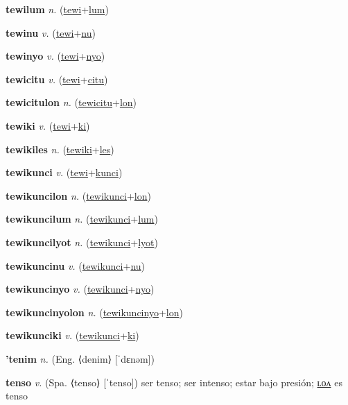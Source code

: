 \textbf{\hypertarget{tewilum}{tewilum}} \textit{n.} (\hyperlink{tewi}{tewi}+\allowbreak \hyperlink{lum}{lum})


\textbf{\hypertarget{tewinu}{tewinu}} \textit{v.} (\hyperlink{tewi}{tewi}+\allowbreak \hyperlink{nu}{nu})


\textbf{\hypertarget{tewinyo}{tewinyo}} \textit{v.} (\hyperlink{tewi}{tewi}+\allowbreak \hyperlink{nyo}{nyo})


\textbf{\hypertarget{tewicitu}{tewicitu}} \textit{v.} (\hyperlink{tewi}{tewi}+\allowbreak \hyperlink{citu}{citu})


\textbf{\hypertarget{tewicitulon}{tewicitulon}} \textit{n.} (\hyperlink{tewicitu}{tewicitu}+\allowbreak \hyperlink{lon}{lon})


\textbf{\hypertarget{tewiki}{tewiki}} \textit{v.} (\hyperlink{tewi}{tewi}+\allowbreak \hyperlink{ki}{ki})


\textbf{\hypertarget{tewikiles}{tewikiles}} \textit{n.} (\hyperlink{tewiki}{tewiki}+\allowbreak \hyperlink{les}{les})


\textbf{\hypertarget{tewikunci}{tewikunci}} \textit{v.} (\hyperlink{tewi}{tewi}+\allowbreak \hyperlink{kunci}{kunci})


\textbf{\hypertarget{tewikuncilon}{tewikuncilon}} \textit{n.} (\hyperlink{tewikunci}{tewikunci}+\allowbreak \hyperlink{lon}{lon})


\textbf{\hypertarget{tewikuncilum}{tewikuncilum}} \textit{n.} (\hyperlink{tewikunci}{tewikunci}+\allowbreak \hyperlink{lum}{lum})


\textbf{\hypertarget{tewikuncilyot}{tewikuncilyot}} \textit{n.} (\hyperlink{tewikunci}{tewikunci}+\allowbreak \hyperlink{lyot}{lyot})


\textbf{\hypertarget{tewikuncinu}{tewikuncinu}} \textit{v.} (\hyperlink{tewikunci}{tewikunci}+\allowbreak \hyperlink{nu}{nu})


\textbf{\hypertarget{tewikuncinyo}{tewikuncinyo}} \textit{v.} (\hyperlink{tewikunci}{tewikunci}+\allowbreak \hyperlink{nyo}{nyo})


\textbf{\hypertarget{tewikuncinyolon}{tewikuncinyolon}} \textit{n.} (\hyperlink{tewikuncinyo}{tewikuncinyo}+\allowbreak \hyperlink{lon}{lon})


\textbf{\hypertarget{tewikunciki}{tewikunciki}} \textit{v.} (\hyperlink{tewikunci}{tewikunci}+\allowbreak \hyperlink{ki}{ki})


\textbf{\hypertarget{'tenim}{'tenim}} \textit{n.} (Eng. ⟨denim⟩ [ˈdɛnəm])


\textbf{\hypertarget{tenso}{tenso}} \textit{v.} (Spa. ⟨tenso⟩ [ˈtenso])
ser tenso; ser intenso; estar bajo presión; \hyperlink{tensolon}{ʟᴏᴧ} es tenso

